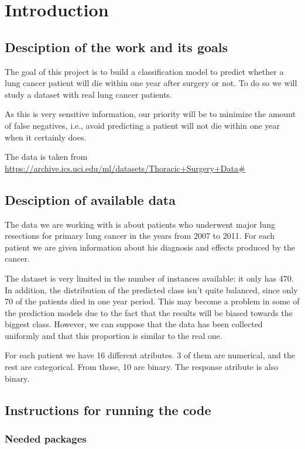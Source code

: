 \section{Introduction}

\subsection{Desciption of the work and its goals}

The goal of this project is to build a classification model to predict whether
a lung cancer patient will die within one year after surgery or not. To do so
we will study a dataset with real lung cancer patients.

As this is very sensitive information, our priority will be to minimize the
amount of false negatives, i.e., avoid predicting a patient will not die within
one year when it certainly does.


The data is taken from
\url{https://archive.ics.uci.edu/ml/datasets/Thoracic+Surgery+Data#}
\cite{zieba2013boosted}

\subsection{Desciption of available data}

The data we are working with is about patients who underwent major lung
resections for primary lung cancer in the years from 2007 to 2011. For each
patient we are given information about his diagnosis and effects produced
by the cancer.

The dataset is very limited in the number of instances available: it only has
470. In addition, the distribution of the predicted class isn't quite balanced,
since only 70 of the patients died in one year period. This may become a problem
in some of the prediction models due to the fact that the results will be biased
towards the biggest class. However, we can suppose that the data has been
collected uniformly and that this proportion is similar to the real one.

For each patient we have 16 different atributes. 3 of them are numerical, and
the rest are categorical. From those, 10 are binary. The response atribute is
also binary.

\subsection{Instructions for running the code}
\subsubsection{Needed packages}

